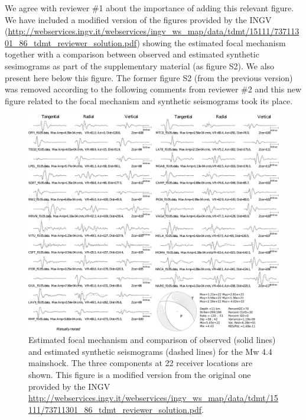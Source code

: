 \documentclass[10pt]{extarticle}
\begin{document}
\begin{Answer}
We agree with reviewer \#1 about the importance of adding this relevant figure. We have included a modified version of the figures provided by the INGV (\url{http://webservices.ingv.it/webservices/ingv_ws_map/data/tdmt/15111/73711301_86_tdmt_reviewer_solution.pdf}) showing the estimated focal mechanism together with a comparison between observed and estimated synthetic sesimograms as part of the supplementary material (as figure S2). We also present here below this figure. The former figure S2 (from the previous version) was removed according to the following comments from reviewer \#2 and this new figure related to the focal mechanism and synthetic seismograms took its place.
\begin{figure}[!h]
\begin{center}
\includegraphics[width=1\linewidth]{S2_Focal_synthetics} 
\end{center}
\caption{Estimated focal mechanism and comparison of observed (solid lines) and estimated synthetic seismograms (dashed lines) for the Mw 4.4 mainshock. The three components at 22 receiver locations are shown. This figure is a modified version from the original one provided by the INGV \url{http://webservices.ingv.it/webservices/ingv_ws_map/data/tdmt/15111/73711301_86_tdmt_reviewer_solution.pdf}.}
\label{fig:S2_focal_mechanism}
\end{figure}
 \WorkInProgressRevTask
\end{Answer}
%
%
\end{document}

